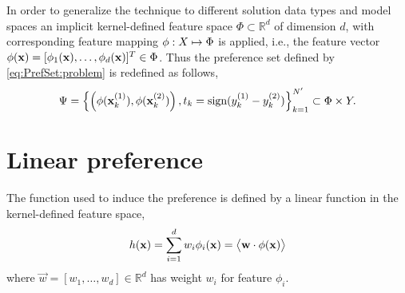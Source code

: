 In order to generalize the technique to different solution data types and model 
spaces an implicit kernel-defined feature space $\Phi\subset\mathbb{R}^d$ of 
dimension $d$, with corresponding feature mapping ${\mathbf{\phi}}:X\mapsto\Phi$ is 
applied, i.e., the feature vector 
${\mathbf{\phi}}(\mathbf{x})=[\phi_1(\mathbf{x}),\ldots,\phi_d(\mathbf{x})]^T\in\Phi$. Thus the 
preference set defined by \cref{eq:PrefSet:problem} is redefined as follows,
\begin{equation}
	\Psi = \left\{\left(\vphi(\vec{x}_k^{(1)}), 
	\vphi(\vec{x}_k^{(2)})\right),t_k=\text{sign}(y_k^{(1)} - 
	y_k^{(2)})\right\}_{k=1}^{N'} \subset \Phi \times Y \label{eq:PrefSet:feat}.
\end{equation}


\section{Linear preference}\label{sec:ord:linpref}
The function used to induce the preference is defined by a linear function in the kernel-defined feature space,
\begin{equation} 
  h(\vec{x}) = \sum_{i=1}^d w_i\phi_i(\vec{x})=\inner{\vec{w}}{\vphi(\vec{x})} 
               \label{eq:pref:kernel}
\end{equation}
where $\vec{w}=[w_1,\ldots,w_d]\in\mathbb{R}^d$ has weight $w_i$ for feature $\phi_i$.


\begin{comment}
Let $\vec{z}$ denote either $\vphi(\vec{x}_k^{(1)})-\vphi(\vec{x}_k^{(2)})$ with \mbox{$t_k=+1$} or 
$\vphi(\vec{x}_k^{(2)})-\vphi(\vec{x}_k^{(1)})$ with \mbox{$t_k=-1$}, positive or negative example respectively.

Logistic regression learns the optimal parameters $\vec{w}\in\mathbb{R}^d$ determined by solving the following task,
\begin{equation}\label{eq:margin}
	\min_{\vec{w}}\quad \tfrac{1}{2}\inner{\vec{w}}{\vec{w}} + C \sum_{i=1}^{N'} \log\left(1 + e^{-y_i \inner{\vec{w}}{\vec{z}_i}}\right) 
\end{equation}
where $C > 0$ is a penalty parameter, and the negative log-likelihood is due to the fact the given data point $\vec{z}_i$ and weights $\vec{w}$ are assumed to follow the probability model,
\begin{equation}\label{eq:prob}
	\mathcal{P}\big(y=\pm1|\vec{z},\vec{w}\big)=\frac{1}{1+e^{-y\inner{\vec{w}}{\vec{z}_i}}}.
\end{equation}
The logistic regression defined in \cref{eq:margin} is solved iteratively, in particular using Trust Region Newton method \citep[cf.][]{Lin08:newtontrustregion}, which generates a sequence $\{\vec{w}^{(k)}\}_{k=1}^\infty$ converging to the optimal solution $\vec{w}^*$ of \cref{eq:margin}.
\end{comment}

